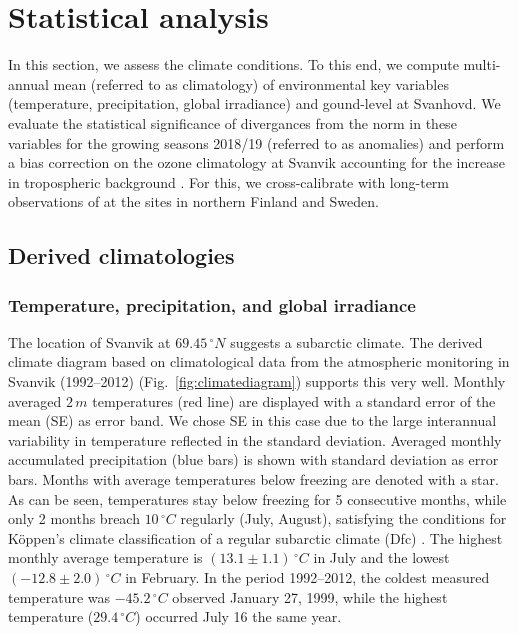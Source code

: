 \documentclass[bg, manuscript]{copernicus}
\begin{document}
\section{Statistical analysis}
\label{sec:stats}
In this section, we assess the climate conditions. To this end, we compute multi-annual mean (referred to as climatology) of environmental key variables (temperature, precipitation, global irradiance) and gound-level \chem{[O_3]} at Svanhovd. We evaluate the statistical significance of divergances from the norm in these variables for the growing seasons 2018/19 (referred to as anomalies) and perform a bias correction on the ozone climatology at Svanvik accounting for the increase in tropospheric background \chem{[O_3]}. For this, we cross-calibrate with long-term observations of \chem{[O_3]} at the sites in northern Finland and Sweden.

\subsection{Derived climatologies}
\label{subsec:climatologies}

\subsubsection{Temperature, precipitation, and global irradiance}
\label{subsubsec:clim_temp_prec}
The location of Svanvik at $69.45\,\unit{^\circ N}$ suggests a subarctic climate. The derived climate diagram based on climatological data from the atmospheric monitoring in Svanvik (1992--2012) (Fig.~\ref{fig:climatediagram}) supports this very well. Monthly averaged $2\,\unit{m}$ temperatures (red line) are displayed with a standard error of the mean (SE) as error band. We chose SE in this case due to the large interannual variability in temperature reflected in the standard deviation. Averaged monthly accumulated precipitation (blue bars) is shown with standard deviation as error bars. Months with average temperatures below freezing are denoted with a star. As can be seen, temperatures stay below freezing for 5 consecutive months, while only 2 months breach $10\,\unit{^\circ C}$ regularly (July, August), satisfying the conditions for K\"{o}ppen's climate classification of a regular subarctic climate (Dfc) \citep[][e.g.]{SD:Beck2018}. The highest monthly average temperature is $(13.1\pm 1.1)\,\unit{^\circ C}$ in July and the lowest $(-12.8\pm 2.0)\,\unit{^\circ C}$ in February. In the period 1992--2012, the coldest measured temperature was $-45.2\,\unit{^\circ C}$ observed January 27, 1999, while the highest temperature ($29.4\,\unit{^\circ C}$) occurred July 16 the same year.
\end{document}

